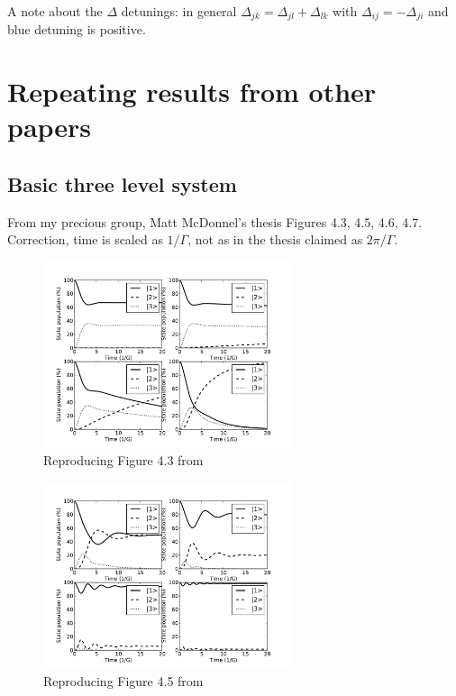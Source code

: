 \documentclass{article}
\begin{document}
\begin{spacing}{1.1}
A note about the $\Delta$ detunings: in general $\Delta_{jk} = \Delta_{jl} + \Delta_{lk}$ with $\Delta_{ij} = - \Delta_{ji}$ and blue detuning is positive.


\section{Repeating results from other papers}

\subsection{Basic three level system}
From my precious group, Matt McDonnel's thesis \cite{McDonnell2003}
Figures 4.3, 4.5, 4.6, 4.7. Correction, time is scaled as $1/\Gamma$, not as in the thesis claimed as $2\pi/\Gamma$.

\begin{figure}
\begin{center}
\includegraphics[width=0.65\textwidth]{figures/matt43.pdf}
\caption{Reproducing Figure 4.3 from \cite{McDonnell2003}}
\label{fig:matt43}
\end{center}
\end{figure}

\begin{figure}
\begin{center}
\includegraphics[width=0.65\textwidth]{figures/matt45.pdf}
\caption{Reproducing Figure 4.5 from \cite{McDonnell2003}}
\label{fig:matt45}
\end{center}
\end{figure}


\end{spacing}
\end{document}
